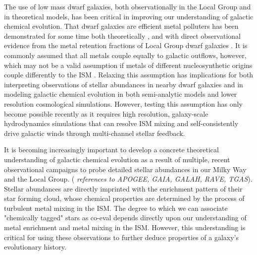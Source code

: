 \documentclass[twocolumn]{aastex61}
\begin{document}
The use of low mass dwarf galaxies, both observationally in the Local Group and in theoretical models, has been critical in improving our understanding of galactic chemical evolution. That dwarf galaxies are efficient metal polluters has been demonstrated for some time both theoretically 
\citep[e.g.][]{DekelSilk1986,MacLowFerrara1999,Fragile2004}, 
and with direct observational evidence from the metal retention fractions of Local Group dwarf galaxies \citep[e.g.][]{Kirby2011-metals,McQuinn2015}. It is commonly assumed that all metals couple equally to galactic outflows, however, which may not be a valid assumption if metals of different nucleosynthetic origins couple differently to the ISM \citep{KrumholzTing2018}. Relaxing this assumption has implications for both interpreting observations of stellar abundances in nearby dwarf galaxies and in modeling galactic chemical evolution in both semi-analytic models and lower resolution cosmological simulations. However, testing this assumption has only become possible recently as it requires high resolution, galaxy-scale hydrodynamics simulations that can resolve ISM mixing and self-consistently drive galactic winds through multi-channel stellar feedback. 

It is becoming increasingly important to develop a concrete theoretical understanding of galactic chemical evolution as a result of multiple, recent observational campaigns to probe detailed stellar abundances in our Milky Way and the Local Group. (\textit{ references to APOGEE, GAIA, GALAH, RAVE, TGAS}). Stellar abundances are directly imprinted with the enrichment pattern of their star forming cloud, whose chemical properties are determined by the process of turbulent metal mixing in the ISM. The degree to which we can associate "chemically tagged" stars as co-eval depends directly upon our understanding of metal enrichment and metal mixing in the ISM. However, this understanding is critical for using these observations to further deduce properties of a galaxy's evolutionary history.
\end{document}
